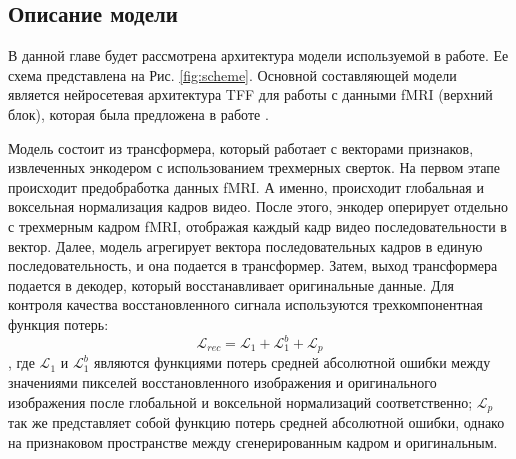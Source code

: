 \documentclass{article}
\begin{document}
\subsection{Описание модели}

В данной главе будет рассмотрена архитектура модели используемой в работе. Ее схема представлена на Рис. \ref{fig:scheme}. Основной составляющей модели является нейросетевая архитектура TFF для работы с данными fMRI (верхний блок), которая была предложена в работе \cite{malkiel2022selfsupervised}.

Модель состоит из трансформера, который работает с векторами признаков, извлеченных энкодером с использованием трехмерных сверток. На первом этапе происходит предобработка данных fMRI. А именно, происходит глобальная и воксельная нормализация кадров видео.  После этого, энкодер оперирует отдельно с трехмерным кадром fMRI, отображая каждый кадр видео последовательности в вектор. Далее, модель агрегирует вектора последовательных кадров в единую последовательность, и она подается в трансформер. Затем, выход трансформера подается в декодер, который восстанавливает оригинальные данные. Для контроля качества восстановленного сигнала используются трехкомпонентная функция потерь:
$$\mathcal{L}_{rec} = \mathcal{L}_1 + \mathcal{L}_1^b + \mathcal{L}_p $$,
где $\mathcal{L}_1$ и $\mathcal{L}_1^b$ являются функциями потерь средней абсолютной ошибки между значениями пикселей восстановленного изображения и оригинального изображения после глобальной и воксельной нормализаций соответственно;
$\mathcal{L}_p $ так же представляет собой функцию потерь средней абсолютной ошибки, однако на признаковом пространстве между сгенерированным кадром и оригинальным.  
\end{document}

